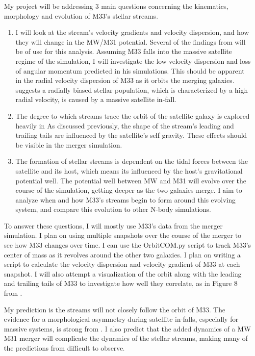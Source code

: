 \documentclass{aastex62}
\begin{document}
My project will be addressing 3 main questions concerning the kinematics, morphology and evolution of M33's stellar streams. 

\begin{enumerate}
    \item I will look at the stream's velocity gradients and velocity dispersion, and how they will change in the MW/M31 potential. Several of the findings from \cite{10.1093/mnras/stw2229} will be of use for this analysis. Assuming M33 falls into the massive satellite regime of the \cite{10.1093/mnras/stw2229} simulation, I will investigate the low velocity dispersion and loss of angular momentum predicted in his simulations. This should be apparent in the radial velocity dispersion of M33 as it orbits the merging galaxies. \cite{10.1093/mnras/stw2229} suggests a radially biased stellar population, which is characterized by a high radial velocity, is caused by a massive satellite in-fall. 
    \item The degree to which streams trace the orbit of the satellite galaxy is explored heavily in \cite{10.1111/j.1365-2966.2007.12313.x} As discussed previously, the shape of the stream's leading and trailing tails are influenced by the satellite's self gravity. These effects should be visible in the merger simulation.
    \item The formation of stellar streams is dependent on the tidal forces between the satellite and its host, which means its influenced by the host's gravitational potential well. The potential well between MW and M31 will evolve over the course of the simulation, getting deeper as the two galaxies merge. I aim to analyze when and how M33's streams begin to form around this evolving system, and compare this evolution to other N-body simulations.
\end{enumerate}

To answer these questions, I will mostly use M33's data from the merger simulation. I plan on using multiple snapshots over the course of the merger to see how M33 changes over time. I can use the OrbitCOM.py script to track M33's center of mass as it revolves around the other two galaxies. I plan on writing a script to calculate the velocity dispersion and velocity gradient of M33 at each snapshot. I will also attempt a visualization of the orbit along with the leading and trailing tails of M33 to investigate how well they correlate, as in Figure 8 from \cite{10.1111/j.1365-2966.2007.12313.x}.

My prediction is the streams will not closely follow the orbit of M33. The evidence for a morphological asymmetry during satellite in-falls, especially for massive systems, is strong from \cite{10.1111/j.1365-2966.2007.12313.x}. I also predict that the added dynamics of a MW M31 merger will complicate the dynamics of the stellar streams, making many of the predictions from \cite{10.1093/mnras/stw2229} difficult to observe.
\end{document}
